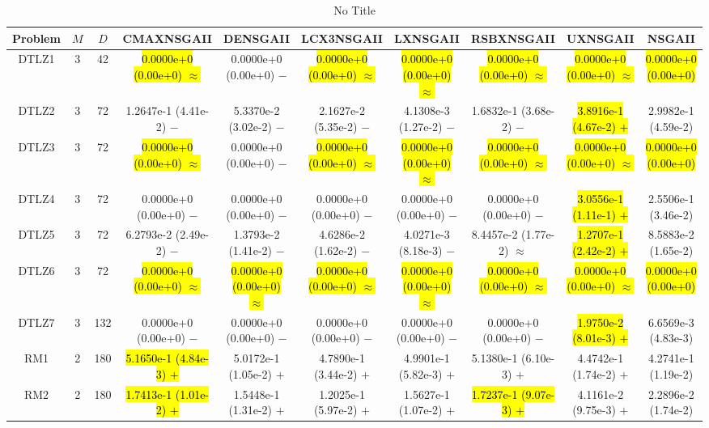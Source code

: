 \documentclass[journal]{IEEEtran}
\begin{document}
\begin{table*}[htbp]
\renewcommand{\arraystretch}{1.2}
\centering
\caption{No Title}
\begin{tabular}{cccccccccc}
\toprule
Problem&$M$&$D$&CMAXNSGAII&DENSGAII&LCX3NSGAII&LXNSGAII&RSBXNSGAII&UXNSGAII&NSGAII\\
\midrule
\multirow{1}{*}{DTLZ1}&3&42&\hl{0.0000e+0 (0.00e+0) $\approx$}&0.0000e+0 (0.00e+0) $-$&\hl{0.0000e+0 (0.00e+0) $\approx$}&\hl{0.0000e+0 (0.00e+0) $\approx$}&\hl{0.0000e+0 (0.00e+0) $\approx$}&\hl{0.0000e+0 (0.00e+0) $\approx$}&\hl{0.0000e+0 (0.00e+0)}\\
\hline
\multirow{1}{*}{DTLZ2}&3&72&1.2647e-1 (4.41e-2) $-$&5.3370e-2 (3.02e-2) $-$&2.1627e-2 (5.35e-2) $-$&4.1308e-3 (1.27e-2) $-$&1.6832e-1 (3.68e-2) $-$&\hl{3.8916e-1 (4.67e-2) $+$}&2.9982e-1 (4.59e-2)\\
\hline
\multirow{1}{*}{DTLZ3}&3&72&\hl{0.0000e+0 (0.00e+0) $\approx$}&0.0000e+0 (0.00e+0) $-$&\hl{0.0000e+0 (0.00e+0) $\approx$}&\hl{0.0000e+0 (0.00e+0) $\approx$}&\hl{0.0000e+0 (0.00e+0) $\approx$}&\hl{0.0000e+0 (0.00e+0) $\approx$}&\hl{0.0000e+0 (0.00e+0)}\\
\hline
\multirow{1}{*}{DTLZ4}&3&72&0.0000e+0 (0.00e+0) $-$&0.0000e+0 (0.00e+0) $-$&0.0000e+0 (0.00e+0) $-$&0.0000e+0 (0.00e+0) $-$&0.0000e+0 (0.00e+0) $-$&\hl{3.0556e-1 (1.11e-1) $+$}&2.5506e-1 (3.46e-2)\\
\hline
\multirow{1}{*}{DTLZ5}&3&72&6.2793e-2 (2.49e-2) $-$&1.3793e-2 (1.41e-2) $-$&4.6286e-2 (1.62e-2) $-$&4.0271e-3 (8.18e-3) $-$&8.4457e-2 (1.77e-2) $\approx$&\hl{1.2707e-1 (2.42e-2) $+$}&8.5883e-2 (1.65e-2)\\
\hline
\multirow{1}{*}{DTLZ6}&3&72&\hl{0.0000e+0 (0.00e+0) $\approx$}&\hl{0.0000e+0 (0.00e+0) $\approx$}&\hl{0.0000e+0 (0.00e+0) $\approx$}&\hl{0.0000e+0 (0.00e+0) $\approx$}&\hl{0.0000e+0 (0.00e+0) $\approx$}&\hl{0.0000e+0 (0.00e+0) $\approx$}&\hl{0.0000e+0 (0.00e+0)}\\
\hline
\multirow{1}{*}{DTLZ7}&3&132&0.0000e+0 (0.00e+0) $-$&0.0000e+0 (0.00e+0) $-$&0.0000e+0 (0.00e+0) $-$&0.0000e+0 (0.00e+0) $-$&0.0000e+0 (0.00e+0) $-$&\hl{1.9750e-2 (8.01e-3) $+$}&6.6569e-3 (4.83e-3)\\
\hline
\multirow{1}{*}{RM1}&2&180&\hl{5.1650e-1 (4.84e-3) $+$}&5.0172e-1 (1.05e-2) $+$&4.7890e-1 (3.44e-2) $+$&4.9901e-1 (5.82e-3) $+$&5.1380e-1 (6.10e-3) $+$&4.4742e-1 (1.74e-2) $+$&4.2741e-1 (1.19e-2)\\
\hline
\multirow{1}{*}{RM2}&2&180&\hl{1.7413e-1 (1.01e-2) $+$}&1.5448e-1 (1.31e-2) $+$&1.2025e-1 (5.97e-2) $+$&1.5627e-1 (1.07e-2) $+$&\hl{1.7237e-1 (9.07e-3) $+$}&4.1161e-2 (9.75e-3) $+$&2.2896e-2 (1.74e-2)\\

\end{tabular}
\end{table*}
\end{document}
